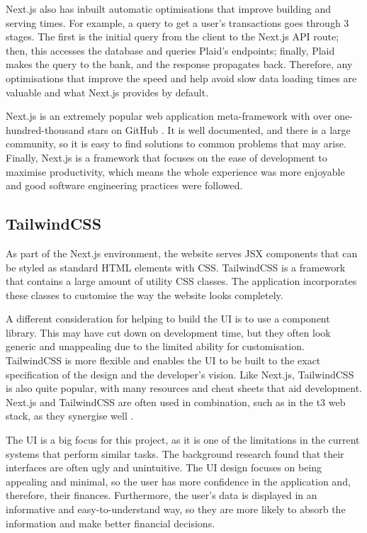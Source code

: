 Next.js also has inbuilt automatic optimisations that improve building and serving times. For example, a query to get a user's transactions goes through 3 stages. The first is the initial query from the client to the Next.js API route; then, this accesses the database and queries Plaid's endpoints; finally, Plaid makes the query to the bank, and the response propagates back. Therefore, any optimisations that improve the speed and help avoid slow data loading times are valuable and what Next.js provides by default.

Next.js is an extremely popular web application meta-framework with over one-hundred-thousand stars on GitHub \cite{NextGitHub}. It is well documented, and there is a large community, so it is easy to find solutions to common problems that may arise. Finally, Next.js is a framework that focuses on the ease of development to maximise productivity, which means the whole experience was more enjoyable and good software engineering practices were followed.

\subsection{TailwindCSS}
As part of the Next.js environment, the website serves JSX components that can be styled as standard HTML elements with CSS. TailwindCSS is a framework that contains a large amount of utility CSS classes. The application incorporates these classes to customise the way the website looks completely.

A different consideration for helping to build the UI is to use a component library. This may have cut down on development time, but they often look generic and unappealing due to the limited ability for customisation. TailwindCSS is more flexible and enables the UI to be built to the exact specification of the design and the developer's vision. Like Next.js, TailwindCSS is also quite popular, with many resources and cheat sheets that aid development. Next.js and TailwindCSS are often used in combination, such as in the t3 web stack, as they synergise well \cite{T3Stack}.

The UI is a big focus for this project, as it is one of the limitations in the current systems that perform similar tasks. The background research found that their interfaces are often ugly and unintuitive. The UI design focuses on being appealing and minimal, so the user has more confidence in the application and, therefore, their finances. Furthermore, the user's data is displayed in an informative and easy-to-understand way, so they are more likely to absorb the information and make better financial decisions.

